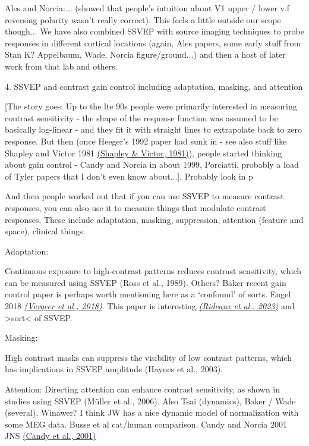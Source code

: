 \documentclass[
  letterpaper,
  DIV=11,
  numbers=noendperiod]{scrartcl}
\begin{document}
Ales and Norcia:... (showed that people's intuition about V1 upper /
lower v.f reversing polarity wasn't really correct). This feels a little
outside our scope though... We have also combined SSVEP with source
imaging techniques to probe responses in different cortical locations
(again, Ales papers, some early stuff from Stan K? Appelbaum, Wade,
Norcia figure/ground...) and then a host of later work from that lab and
others.

\label{anchor-6}{}4. SSVEP and contrast gain control
including adaptation, masking, and attention

{[}The story goes: Up to the lte 90s people were primarily interested in
measuring contrast sensitivity - the shape of the response function was
assumed to be basically log-linear - and they fit it with straight lines
to extrapolate back to zero response. But then (once Heeger's 1992 paper
had sunk in - see also stuff like Shapley and Victor 1981
\href{https://www.zotero.org/google-docs/?zAmtgj}{(Shapley \& Victor,
1981)}), people started thinking about gain control - Candy and Norcia
in about 1999, Porciatti, probably a load of Tyler papers that I don't
even know about...{]}. Probably look in p

And then people worked out that if you can use SSVEP to measure contrast
responses, you can also use it to measure things that modulate contrast
responses. These include adaptation, masking, suppression, attention
(feature and space), clinical things.

\label{anchor-7}{}Adaptation:

Continuous exposure to high-contrast patterns reduces contrast
sensitivity, which can be measured using SSVEP (Ross et al., 1989).
Others? Baker recent gain control paper is perhaps worth mentioning here
as a `confound' of sorts. Engel 2018
\href{https://www.zotero.org/google-docs/?kdURiS}{\emph{(Vergeer et al.,
2018)}}. This paper is interesting
\href{https://www.zotero.org/google-docs/?J2EO3d}{\emph{(Rideaux et al.,
2023)}} and \textgreater sort\textless{} of SSVEP.

\label{anchor-8}{}Masking:

High contrast masks can suppress the visibility of low contrast
patterns, which has implications in SSVEP amplitude (Haynes et al.,
2003).

Attention: Directing attention can enhance contrast sensitivity, as
shown in studies using SSVEP (Müller et al., 2006). Also Tsai
(dynamics), Baker / Wade (several), Winawer? I think JW has a nice
dynamic model of normalization with some MEG data. Busse et al cat/human
comparison. Candy and Norcia 2001 JNS
\href{https://www.zotero.org/google-docs/?7hhs5Z}{(Candy et al., 2001)}
\end{document}
